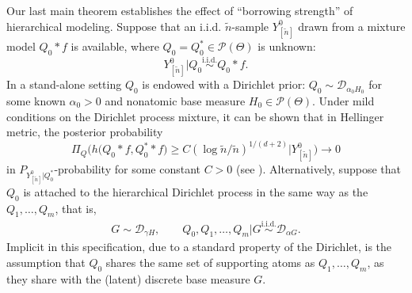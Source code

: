 \documentclass[MSNbibl,number,citesort]{arxbj}
\newcommand{\Pcal}{\mathscr{P}}
\newcommand{\DP}{\mathscr{D}}
\newcommand{\nn}{\tilde{n}}
\begin{document}
%
Our last main theorem
establishes the effect of ``borrowing strength'' of hierarchical modeling.
Suppose
that an i.i.d. $\nn$-sample $Y_{[\nn]}^0$ drawn from a mixture model
$Q_0*f$ is available,
where $Q_0 = Q_0^*\in\Pcal(\Theta)$ is unknown:
%
%
\begin{equation}
Y_{[\nn]}^0 | Q_0 \stackrel{\mathrm{i.i.d.}} {
\sim} Q_0*f.
\end{equation}
%
In a stand-alone setting $Q_0$
is endowed with a Dirichlet prior: $Q_0\sim\DP_{\alpha_0 H_0}$ for
some known $\alpha_0 > 0$ and nonatomic base measure $H_0 \in\Pcal
(\Theta)$.
Under mild conditions on the Dirichlet process mixture,
it can be shown that in Hellinger metric, the posterior probability
%
%
\begin{equation}
\label{Eqn-rate-standalone} \Pi_Q \bigl(h\bigl(Q_0*f,Q_0^**f
\bigr)\geq C( \log\nn/\nn)^{{1}/{(d+2)}} | Y_{[\nn]}^0 \bigr)
\longrightarrow0
\end{equation}
%
in $P_{Y^0_{[\nn]}|Q_0^*}$-probability for some constant $C>0$
(see \cite{Nguyen-11}).
Alternatively, suppose that
$Q_0$ is attached to the hierarchical Dirichlet process in
the same way as the $Q_1,\ldots,Q_m$, that is,
%
%
\begin{eqnarray}
\label{Eqn-HM-4intro} G \sim\DP_{\gamma H},\qquad Q_0, Q_1,
\ldots, Q_m | G \stackrel{\mathrm{i.i.d.}} {\sim} \DP_{\alpha G}.
\end{eqnarray}
%
Implicit in this specification, due to a standard property
of the Dirichlet, is the assumption that $Q_0$ shares
the same set of supporting atoms as $Q_1,\ldots,Q_m$, as they share
with the (latent) discrete base measure $G$.
\end{document}
